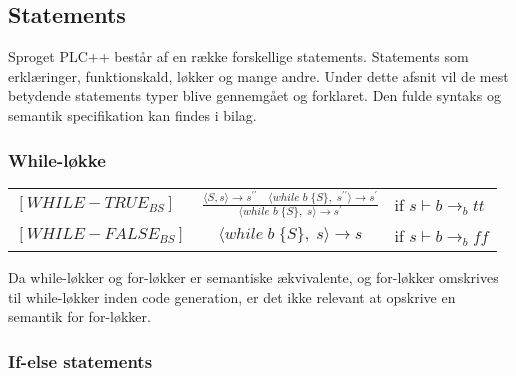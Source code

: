 \noindent \subsection{Statements}
Sproget PLC++ består af en række forskellige statements. Statements som erklæringer, funktionskald, løkker og mange andre. Under dette afsnit vil de mest betydende statements typer blive gennemgået og forklaret. Den fulde syntaks og semantik specifikation kan findes i bilag.





\noindent \subsubsection{While-løkke}

    \begin{semantik}
    \bgroup
    \def\arraystretch{3}
    \begin{table}[H]
    \centering
    \begin{tabular}{l c l}
        
        $[WHILE-TRUE_{BS}]$ & $
        \frac{\langle S, s\rangle  \rightarrow s^{\prime\prime} \quad \langle while\;b\;\{ S\},\;s^{\prime\prime}\rangle  \rightarrow s^{\prime}}
        {\langle while\;b\;\{ S\},\;s\rangle  \rightarrow s^{\prime}}
        $ & if $s \vdash b \rightarrow_b tt$ \\
        
        $[WHILE-FALSE_{BS}]$ & $
        \langle while\;b\;\{S\},\;s\rangle  \rightarrow s$ & 
        if $s \vdash b \rightarrow_b ff$ \\

    \end{tabular}
    \label{tab:while}
    \end{table}
    \egroup
    \caption{While-løkke}
    \end{semantik}
    
Da while-løkker og for-løkker er semantiske ækvivalente, og for-løkker omskrives til while-løkker inden code generation, er det ikke relevant at opskrive en semantik for for-løkker.

\noindent \subsubsection{If-else statements}

